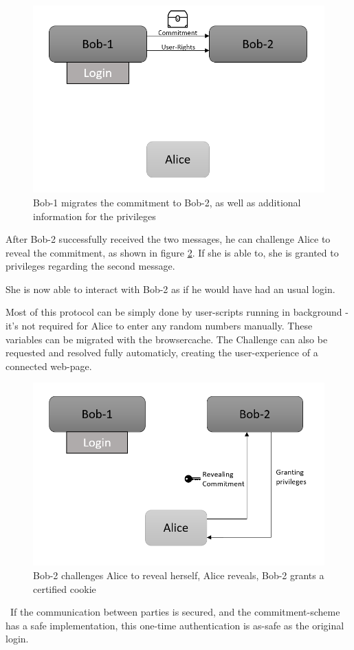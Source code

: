 \begin{figure}[h]
	\centering
	\includegraphics[width=0.6\linewidth]{Images/UseCaseTwo}
	\caption[Protocol Start]{Bob-1 migrates the commitment to Bob-2, as well as additional information for the privileges}
	\label{fig:usecasetwo}
\end{figure}
After Bob-2 successfully received the two messages, he can challenge Alice to reveal the commitment, as shown in figure \ref{fig:usecasethree}. If she is able to, she is granted to privileges regarding the second message. 

She is now able to interact with Bob-2 as if he would have had an usual login.

Most of this protocol can be simply done by user-scripts running in background - it's not required for Alice to enter any random numbers manually. These variables can be migrated with the browsercache. The Challenge can also be requested and resolved fully automaticly, creating the user-experience of a connected web-page.  
\begin{figure}[h]
	\centering
	\includegraphics[width=0.6\linewidth]{Images/UseCaseThree}
	\caption[Protocol Start]{Bob-2 challenges Alice to reveal herself, Alice reveals, Bob-2 grants a certified cookie}
	\label{fig:usecasethree}
\end{figure}

~\newline If the communication between parties is secured, and the commitment-scheme has a safe implementation, this one-time authentication is as-safe as the original login. 